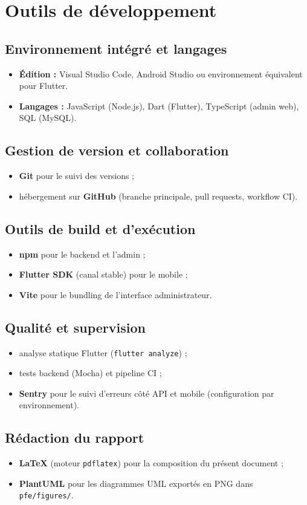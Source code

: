 \chapter{Outils de développement}

\section{Environnement intégré et langages}

\begin{itemize}[leftmargin=*]
  \item \textbf{Édition :} Visual Studio Code, Android Studio ou environnement équivalent pour Flutter.
  \item \textbf{Langages :} JavaScript (Node.js), Dart (Flutter), TypeScript (admin web), SQL (MySQL).
\end{itemize}

\section{Gestion de version et collaboration}

\begin{itemize}[leftmargin=*]
  \item \textbf{Git} pour le suivi des versions ;
  \item hébergement sur \textbf{GitHub} (branche principale, pull requests, workflow CI).
\end{itemize}

\section{Outils de build et d'exécution}

\begin{itemize}[leftmargin=*]
  \item \textbf{npm} pour le backend et l'admin ;
  \item \textbf{Flutter SDK} (canal stable) pour le mobile ;
  \item \textbf{Vite} pour le bundling de l'interface administrateur.
\end{itemize}

\section{Qualité et supervision}

\begin{itemize}[leftmargin=*]
  \item analyse statique Flutter (\texttt{flutter analyze}) ;
  \item tests backend (Mocha) et pipeline CI ;
  \item \textbf{Sentry} pour le suivi d'erreurs côté API et mobile (configuration par environnement).
\end{itemize}

\section{Rédaction du rapport}

\begin{itemize}[leftmargin=*]
  \item \textbf{\LaTeX} (moteur \texttt{pdflatex}) pour la composition du présent document ;
  \item \textbf{PlantUML} pour les diagrammes UML exportés en PNG dans \texttt{pfe/figures/}.
\end{itemize}
